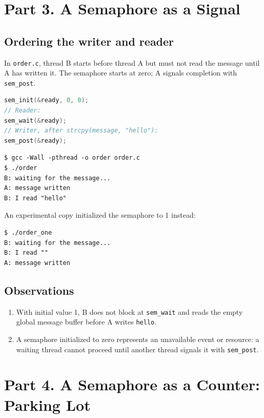 \documentclass[12pt,a4paper]{article}
\begin{document}
\section{Part 3. A Semaphore as a Signal}
\subsection{Ordering the writer and reader}
In \texttt{order.c}, thread B starts before thread A but must not read the message until A has written it. The semaphore starts at zero; A signals completion with \texttt{sem\_post}.
\begin{lstlisting}[language=C]
sem_init(&ready, 0, 0);
// Reader:
sem_wait(&ready);
// Writer, after strcpy(message, "hello"):
sem_post(&ready);
\end{lstlisting}
\begin{lstlisting}
$ gcc -Wall -pthread -o order order.c
$ ./order
B: waiting for the message...
A: message written
B: I read "hello"
\end{lstlisting}
An experimental copy initialized the semaphore to 1 instead:
\begin{lstlisting}
$ ./order_one
B: waiting for the message...
B: I read ""
A: message written
\end{lstlisting}
\subsection{Observations}
\begin{enumerate}[label=\arabic*.]
\item With initial value 1, B does not block at \texttt{sem\_wait} and reads the empty global message buffer before A writes \texttt{hello}.
\item A semaphore initialized to zero represents an unavailable event or resource: a waiting thread cannot proceed until another thread signals it with \texttt{sem\_post}.
\end{enumerate}

\section{Part 4. A Semaphore as a Counter: Parking Lot}
\end{document}
